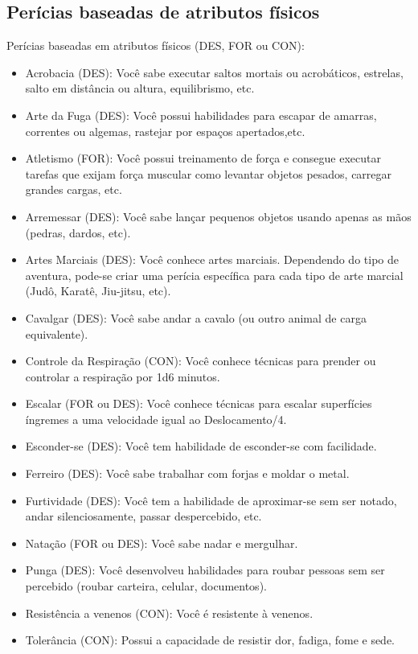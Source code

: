 \subsection{\label{sec:perFisicos}Perícias baseadas de atributos físicos}
Perícias baseadas em atributos físicos (DES, FOR ou CON):
\begin{itemize}
	\item Acrobacia (DES): Você sabe executar saltos mortais ou acrobáticos, estrelas, salto em distância ou altura, equilibrismo, etc.
	\item Arte da Fuga (DES): Você possui habilidades para escapar de amarras, correntes ou algemas, rastejar por espaços apertados,etc.
	\item Atletismo (FOR): Você possui treinamento de força e consegue executar tarefas que exijam força muscular como levantar objetos pesados, carregar grandes cargas, etc.
	\item Arremessar (DES): Você sabe lançar pequenos objetos usando apenas as mãos (pedras, dardos, etc).
	\item Artes Marciais (DES): Você conhece artes marciais. Dependendo do tipo de aventura, pode-se criar uma perícia específica para cada tipo de arte marcial (Judô, Karatê, Jiu-jitsu, etc).
	\item Cavalgar (DES): Você sabe andar a cavalo (ou outro animal de carga equivalente).
	\item Controle da Respiração (CON): Você conhece técnicas para prender ou controlar a respiração por 1d6 minutos.
	\item Escalar (FOR ou DES): Você conhece técnicas para escalar superfícies íngremes a uma velocidade igual ao Deslocamento/4.
	\item Esconder-se (DES): Você tem habilidade de esconder-se com facilidade.
	\item Ferreiro (DES): Você sabe trabalhar com forjas e moldar o metal.
	\item Furtividade (DES): Você tem a habilidade de aproximar-se sem ser notado, andar silenciosamente, passar despercebido, etc.
	\item Natação (FOR ou DES): Você sabe nadar e mergulhar.
	\item Punga (DES): Você desenvolveu habilidades para roubar pessoas sem ser percebido (roubar carteira, celular, documentos).
	\item Resistência a venenos (CON): Você é resistente à venenos.
	\item Tolerância (CON): Possui a capacidade de resistir dor, fadiga, fome e sede.
\end{itemize}

